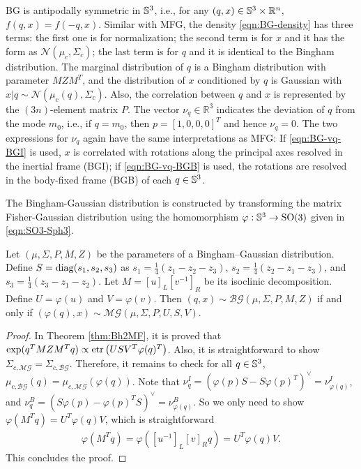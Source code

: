 BG is antipodally symmetric in $\mathbb{S}^3$, i.e., for any $(q,x)\in\mathbb{S}^3\times\mathbb{R}^n$, $f(q,x) = f(-q,x)$.
Similar with MFG, the density \eqref{eqn:BG-density} has three terms:
the first one is for normalization; the second term is for $x$ and it has the form as $\mathcal{N}(\mu_c, \Sigma_c)$; the last term is for $q$ and it is identical to the Bingham distribution.
The marginal distribution of $q$ is a Bingham distribution with parameter $MZM^T$, and the distribution of $x$ conditioned by $q$ is Gaussian with $x|q\sim\mathcal{N}(\mu_c(q), \Sigma_c)$.
Also, the correlation between $q$ and $x$ is represented by the $(3n)$-element matrix $P$.
The vector $\nu_q\in\mathbb{R}^3$ indicates the deviation of $q$ from the mode $m_0$, i.e., if $q=m_0$, then $p = [1,0,0,0]^T$ and hence $\nu_q = 0$.
The two expressions for $\nu_q$ again have the same interpretations as MFG:
If \eqref{eqn:BG-vq-BGI} is used, $x$ is correlated with rotations along the principal axes resolved in the inertial frame (BGI);
if \eqref{eqn:BG-vq-BGB} is used, the rotations are resolved in the body-fixed frame (BGB) of each $q\in\mathbb{S}^3$.

The Bingham-Gaussian distribution is constructed by transforming the matrix Fisher-Gaussian distribution using the homomorphism $\varphi: \mathbb{S}^3\to\mathrm{SO}(3)$ given in \eqref{eqn:SO3-Sph3}.
\begin{theorem} \label{thm:BG-MFG}
	Let $(\mu,\Sigma,P,M,Z)$ be the parameters of a Bingham--Gaussian distribution.
	Define $S = \mathrm{diag}(s_1,s_2,s_3)$ as $s_1 = \tfrac{1}{4}(z_1-z_2-z_3)$, $s_2 = \tfrac{1}{4}(z_2-z_1-z_3)$, and $s_3 = \tfrac{1}{4}(z_3-z_1-z_2)$.
	Let $M = [u]_L[v^{-1}]_R$ be its isoclinic decomposition.
	Define $U = \varphi(u)$ and $V = \varphi(v)$.
	Then $(q,x)\sim\mathcal{BG}(\mu,\Sigma,P,M,Z)$ if and only if $(\varphi(q),x)\sim\mathcal{MG}(\mu,\Sigma,P,U,S,V)$.
\end{theorem}
\begin{proof}
	In Theorem \ref{thm:Bh2MF}, it is proved that $\exp(q^TMZM^Tq) \propto \mathrm{etr}\left( USV^T\varphi(q)^T \right)$.
	Also, it is straightforward to show $\Sigma_{c,\mathcal{MG}} = \Sigma_{c,\mathcal{BG}}$.
	Therefore, it remains to check for all $q\in\mathbb{S}^3$, $\mu_{c,\mathcal{BG}}(q) = \mu_{c,\mathcal{MG}}(\varphi(q))$.
	Note that $\nu_q^I = \allowbreak (\varphi(p)S-S\varphi(p)^T)^\vee = \allowbreak \nu_{\varphi(q)}^I$, and $\nu_q^B = \allowbreak (S\varphi(p)-\varphi(p)^TS)^\vee = \allowbreak \nu_{\varphi(q)}^B$.
	So we only need to show $\varphi(M^Tq) = U^T\varphi(q)V$, which is straightforward
	\begin{align*}
		\varphi(M^Tq) = \varphi([u^{-1}]_L[v]_Rq) = U^T\varphi(q)V.
	\end{align*}
	This concludes the proof.
\end{proof}

